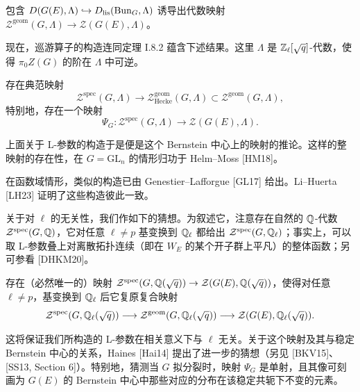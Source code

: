 包含 $D(G(E),\Lambda)\hookrightarrow D_{\mathrm{lis}}(\mathrm{Bun}_G,\Lambda)$ 诱导出代数映射 $\mathcal{Z}^{\mathrm{geom}}(G,\Lambda)\to\mathcal{Z}(G(E),\Lambda)$。

现在，巡游算子的构造连同定理 I.8.2 蕴含下述结果。这里 $\Lambda$ 是 $\mathbb{Z}_\ell[\sqrt q]$-代数，使得 $\pi_0Z(G)$ 的阶在 $\Lambda$ 中可逆。

\begin{proposition}%
存在典范映射
\[
\mathcal{Z}^{\mathrm{spec}}(G,\Lambda)\longrightarrow\mathcal{Z}^{\mathrm{geom}}_{\mathrm{Hecke}}(G,\Lambda)\subset\mathcal{Z}^{\mathrm{geom}}(G,\Lambda),
\]
特别地，存在一个映射
\[
\Psi_G:\mathcal{Z}^{\mathrm{spec}}(G,\Lambda)\longrightarrow\mathcal{Z}(G(E),\Lambda).
\]
\end{proposition}

上面关于 L-参数的构造于是便是这个 Bernstein 中心上的映射的推论。这样的整映射的存在性，在 $G=\mathrm{GL}_n$ 的情形归功于 Helm–Moss [HM18]。

\begin{remark}%
在函数域情形，类似的构造已由 Genestier–Lafforgue [GL17] 给出。Li–Huerta [LH23] 证明了这些构造彼此一致。
\end{remark}

关于对 $\ell$ 的无关性，我们作如下的猜想。为叙述它，注意存在自然的 $\mathbb{Q}$-代数 $\mathcal{Z}^{\mathrm{spec}}(G,\mathbb{Q})$，它对任意 $\ell\neq p$ 基变换到 $\mathbb{Q}_\ell$ 都给出 $\mathcal{Z}^{\mathrm{spec}}(G,\mathbb{Q}_\ell)$；事实上，可以取 L-参数叠上对离散拓扑连续（即在 $W_E$ 的某个开子群上平凡）的整体函数；另可参看 [DHKM20]。

\begin{conjecture}%
存在（必然唯一的）映射 $\mathcal{Z}^{\mathrm{spec}}(G,\mathbb{Q}(\sqrt q))\to\mathcal{Z}(G(E),\mathbb{Q}(\sqrt q))$，使得对任意 $\ell\neq p$，基变换到 $\mathbb{Q}_\ell$ 后它复原复合映射
\[
\mathcal{Z}^{\mathrm{spec}}(G,\mathbb{Q}_\ell(\sqrt q))\longrightarrow\mathcal{Z}^{\mathrm{geom}}(G,\mathbb{Q}_\ell(\sqrt q))\longrightarrow\mathcal{Z}(G(E),\mathbb{Q}_\ell(\sqrt q)).
\]
\end{conjecture}

这将保证我们所构造的 L-参数在相关意义下与 $\ell$ 无关。关于这个映射及其与稳定 Bernstein 中心的关系，Haines [Hai14] 提出了进一步的猜想（另见 [BKV15]、[SS13, Section 6]）。特别地，猜测当 $G$ 拟分裂时，映射 $\Psi_G$ 是单射，且其像可刻画为 $G(E)$ 的 Bernstein 中心中那些对应的分布在该稳定共轭下不变的元素。

